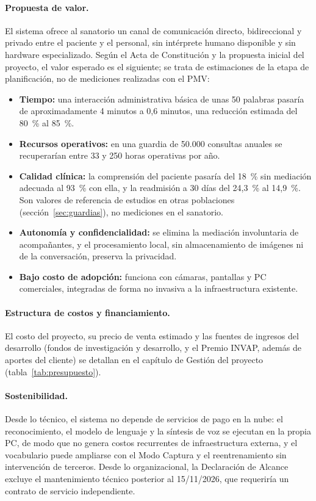 \paragraph{Propuesta de valor.} El sistema ofrece al sanatorio un canal de comunicación directo, bidireccional y privado entre el paciente y el personal, sin intérprete humano disponible y sin hardware especializado. Según el Acta de Constitución y la propuesta inicial del proyecto, el valor esperado es el siguiente; se trata de estimaciones de la etapa de planificación, no de mediciones realizadas con el PMV:
\begin{itemize}
  \item \textbf{Tiempo:} una interacción administrativa básica de unas 50 palabras pasaría de aproximadamente 4 minutos a 0,6 minutos, una reducción estimada del 80~\% al 85~\%.
  \item \textbf{Recursos operativos:} en una guardia de 50.000 consultas anuales se recuperarían entre 33 y 250 horas operativas por año.
  \item \textbf{Calidad clínica:} la comprensión del paciente pasaría del 18~\% sin mediación adecuada al 93~\% con ella, y la readmisión a 30 días del 24,3~\% al 14,9~\%. Son valores de referencia de estudios en otras poblaciones (sección~\ref{sec:guardias}), no mediciones en el sanatorio.
  \item \textbf{Autonomía y confidencialidad:} se elimina la mediación involuntaria de acompañantes, y el procesamiento local, sin almacenamiento de imágenes ni de la conversación, preserva la privacidad.
  \item \textbf{Bajo costo de adopción:} funciona con cámaras, pantallas y PC comerciales, integradas de forma no invasiva a la infraestructura existente.
\end{itemize}

\paragraph{Estructura de costos y financiamiento.} El costo del proyecto, su precio de venta estimado y las fuentes de ingresos del desarrollo (fondos de investigación y desarrollo, y el Premio INVAP, además de aportes del cliente) se detallan en el capítulo de Gestión del proyecto (tabla~\ref{tab:presupuesto}).

\paragraph{Sostenibilidad.} Desde lo técnico, el sistema no depende de servicios de pago en la nube: el reconocimiento, el modelo de lenguaje y la síntesis de voz se ejecutan en la propia PC, de modo que no genera costos recurrentes de infraestructura externa, y el vocabulario puede ampliarse con el Modo Captura y el reentrenamiento sin intervención de terceros. Desde lo organizacional, la Declaración de Alcance excluye el mantenimiento técnico posterior al 15/11/2026, que requeriría un contrato de servicio independiente.

